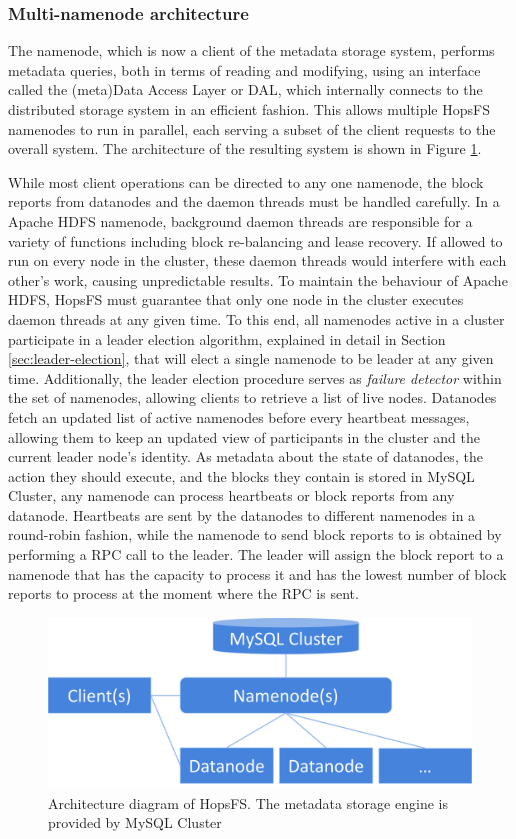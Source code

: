 \subsubsection{Multi-namenode architecture}
The namenode, which is now a client of the metadata storage system, performs metadata queries, both in terms of reading and modifying, using an interface called the (meta)Data Access Layer or DAL, which internally connects to the distributed storage system in an efficient fashion.
This allows multiple HopsFS namenodes to run in parallel, each serving a subset of the client requests to the overall system.
The architecture of the resulting system is shown in Figure \ref{fig:hopsfs-architecture}.

While most client operations can be directed to any one namenode, the block reports from datanodes and the daemon threads must be handled carefully.
In a Apache HDFS namenode, background daemon threads are responsible for a variety of functions including block re-balancing and lease recovery.
If allowed to run on every node in the cluster, these daemon threads would interfere with each other's work, causing unpredictable results.
To maintain the behaviour of Apache HDFS, HopsFS must guarantee that only one node in the cluster executes daemon threads at any given time.
To this end, all namenodes active in a cluster participate in a leader election algorithm, explained in detail in Section \ref{sec:leader-election}, that will elect a single namenode to be leader at any given time.
Additionally, the leader election procedure serves as \emph{failure detector} within the set of namenodes, allowing clients to retrieve a list of live nodes.
Datanodes fetch an updated list of active namenodes before every heartbeat messages, allowing them to keep an updated view of participants in the cluster and the current leader node's identity.
As metadata about the state of datanodes, the action they should execute, and the blocks they contain is stored in MySQL Cluster, any namenode can process heartbeats or block reports from any datanode.
Heartbeats are sent by the datanodes to different namenodes in a round-robin fashion, while the namenode to send block reports to is obtained by performing a RPC call to the leader.
The leader will assign the block report to a namenode that has the capacity to process it and has the lowest number of block reports to process at the moment where the RPC is sent.

\begin{figure}[h]
\caption{Architecture diagram of HopsFS. The metadata storage engine is provided by MySQL Cluster}
\label{fig:hopsfs-architecture}
\centering
\includegraphics[width=1.0\textwidth]{images/hopsfs-block-diagram.png}
\end{figure}

